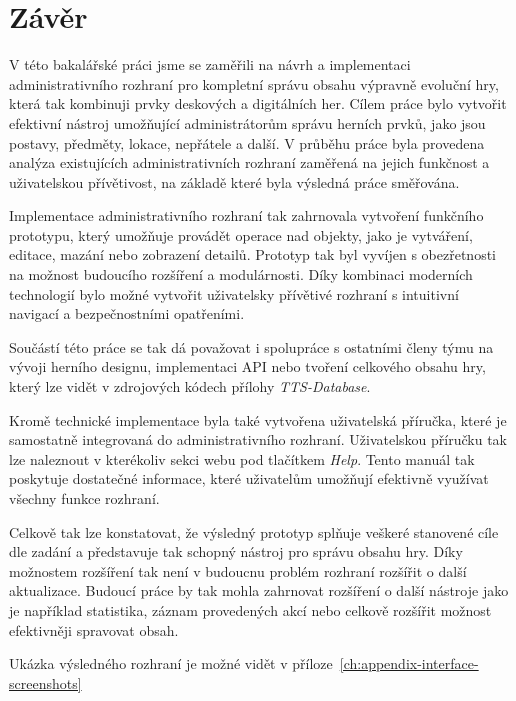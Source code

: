 \chapter{Závěr}
\label{ch:conclusion}

V této bakalářské práci jsme se zaměřili na návrh a implementaci administrativního rozhraní pro kompletní správu obsahu výpravně evoluční hry, která tak kombinuji prvky deskových a digitálních her. Cílem práce bylo vytvořit efektivní nástroj umožňující administrátorům správu herních prvků, jako jsou postavy, předměty, lokace, nepřátele a další. V průběhu práce byla provedena analýza existujících administrativních rozhraní zaměřená na jejich funkčnost a uživatelskou přívětivost, na základě které byla výsledná práce směřována.

Implementace administrativního rozhraní tak zahrnovala vytvoření funkčního prototypu, který umožňuje provádět operace nad objekty, jako je vytváření, editace, mazání nebo zobrazení detailů. Prototyp tak byl vyvíjen s obezřetnosti na možnost budoucího rozšíření a modulárnosti. Díky kombinaci moderních technologií bylo možné vytvořit uživatelsky přívětivé rozhraní s intuitivní navigací a bezpečnostními opatřeními.

Součástí této práce se tak dá považovat i spolupráce s ostatními členy týmu na vývoji herního designu, implementaci API nebo tvoření celkového obsahu hry, který lze vidět v zdrojových kódech přílohy \textit{TTS-Database}.

Kromě technické implementace byla také vytvořena uživatelská příručka, které je samostatně integrovaná do administrativního rozhraní. Uživatelskou příručku tak lze naleznout v kterékoliv sekci webu pod tlačítkem \textit{Help}. Tento manuál tak poskytuje dostatečné informace, které uživatelům umožňují efektivně využívat všechny funkce rozhraní.

Celkově tak lze konstatovat, že výsledný prototyp splňuje veškeré stanovené cíle dle zadání a představuje tak schopný nástroj pro správu obsahu hry. Díky možnostem rozšíření tak není v budoucnu problém rozhraní rozšířit o další aktualizace. Budoucí práce by tak mohla zahrnovat rozšíření o další nástroje jako je například statistika, záznam provedených akcí nebo celkově rozšířit možnost efektivněji spravovat obsah.

Ukázka výsledného rozhraní je možné vidět v příloze~\ref{ch:appendix-interface-screenshots}

\endinput